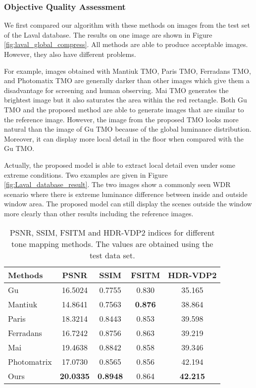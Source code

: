 \documentclass[journal]{IEEEtran}
\begin{document}
\subsubsection{Objective Quality Assessment} 
We first compared our algorithm with these methods on images from the test set of the Laval database. The results on one image are shown in Figure \ref{fig:laval_global_compress}. All methods are able to produce acceptable images. However, they also have different problems. 

For example, images obtained with Mantiuk TMO, Paris TMO, Ferradans TMO, and Photomatix TMO are generally darker than other images which give them a disadvantage for screening and human observing. Mai TMO generates the brightest image but it also saturates the area within the red rectangle. Both Gu TMO and the proposed method are able to generate images that are similar to the reference image. However, the image from the proposed TMO looks more natural than the image of Gu TMO because of the global luminance distribution. Moreover, it can display more local detail in the floor when compared with the Gu TMO.

Actually, the proposed model is able to extract local detail even under some extreme conditions. Two examples are given in Figure \ref{fig:Laval_database_result}. The two images show a commonly seen WDR scenario where there is extreme luminance difference between inside and outside window area. The proposed model can still display the scenes outside the window more clearly than other results including the reference images.

\begin{table}[tb]
\footnotesize
\begin{center}
\caption{PSNR, SSIM, FSITM and HDR-VDP2 indices for different tone mapping methods. The values are obtained using the test data set.}
\begin{tabular}{l|c|c|c|c}
\hline
 Methods & PSNR & SSIM & FSITM & HDR-VDP2 \\ \hline
Gu \cite{gu2013local} & 16.5024 & 0.7755 & 0.830 & 35.165 \\
Mantiuk \cite{mantiuk2008display} & 14.8641 & 0.7563 & \textbf{0.876} & 38.864 \\
Paris \cite{paris2015local} & 18.3214 & 0.8443 & 0.853  & 39.598 \\
Ferradans \cite{ferradans2011analysis} & 16.7242 & 0.8756 & 0.863 & 39.219 \\
Mai \cite{mai2011optimizing} & 19.4638 & 0.8842 & 0.858 & 39.346 \\
Photomatrix \cite{photomatrix} & 17.0730 & 0.8565 & 0.856 & 42.194 \\
 Ours & \textbf{20.0335} & \textbf{0.8948} & 0.864 & \textbf{42.215} \\ \hline
\end{tabular}
\label{table:laval_database_PSNR}
\end{center}
\end{table}
\end{document}
